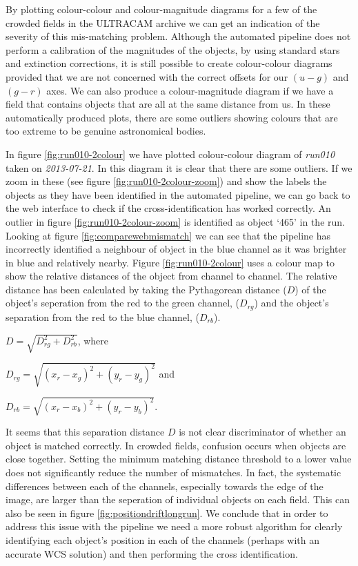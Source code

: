 By plotting colour-colour and colour-magnitude diagrams for a few of the crowded fields in the ULTRACAM archive we can get an indication of the severity of this mis-matching problem. Although the automated pipeline does not perform a calibration of the magnitudes of the objects, by using standard stars and extinction corrections, it is still possible to create colour-colour diagrams provided that we are not concerned with the correct offsets for our $(u-g)$ and $(g-r)$ axes. We can also produce a colour-magnitude diagram if we have a field that contains objects that are all at the same distance from us. In these automatically produced plots, there are some outliers showing colours that are too extreme to be genuine astronomical bodies. 

In figure \ref{fig:run010-2colour} we have plotted colour-colour diagram of \emph{run010} taken on \emph{2013-07-21}. In this diagram it is clear that there are some outliers. If we zoom in these (see figure \ref{fig:run010-2colour-zoom}) and show the labels the objects as they have been identified in the automated pipeline, we can go back to the web interface to check if the cross-identification has worked correctly. An outlier in figure \ref{fig:run010-2colour-zoom} is identified as object `465' in the run. Looking at figure \ref{fig:comparewebmismatch} we can see that the pipeline has incorrectly identified a neighbour of object in the blue channel as it was brighter in blue and relatively nearby. Figure \ref{fig:run010-2colour} uses a colour map to show the relative distances of the object from channel to channel. The relative distance has been calculated by taking the Pythagorean distance ($D$) of the object's seperation from the red to the green channel, ($D_{rg}$) and the object's separation from the red to the blue channel, ($D_{rb}$).  

$D = \sqrt{ D_{rg}^2 + D_{rb}^2}$, where

$D_{rg} = \sqrt{ (x_r - x_g)^2 + (y_r - y_g)^2} $ and

$D_{rb} = \sqrt{ (x_r - x_b)^2 + (y_r - y_b)^2} $.

It seems that this separation distance $D$ is not clear discriminator of whether an object is matched correctly. In crowded fields, confusion occurs when objects are close together. Setting the minimum matching distance threshold to a lower value does not significantly reduce the number of mismatches. In fact, the systematic differences between each of the channels, especially towards the edge of the image, are larger than the seperation of individual objects on each field. This can also be seen in figure \ref{fig:positiondriftlongrun}.  We conclude that in order to address this issue with the pipeline we need a more robust algorithm for clearly identifying each object's position in each of the channels (perhaps with an accurate WCS solution) and then performing the cross identification. 

